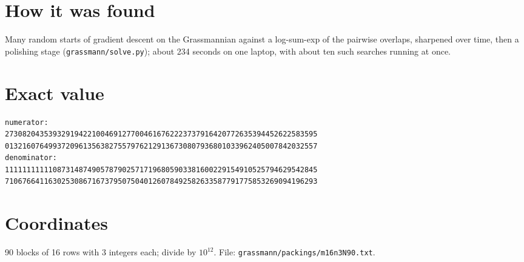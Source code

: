 \documentclass[11pt,a4paper]{article}
\begin{document}
\section{How it was found}
Many random starts of gradient descent on the Grassmannian against a log-sum-exp of the pairwise overlaps, sharpened over time, then a polishing stage (\texttt{grassmann/solve.py}); about 234 seconds on one laptop, with about ten such searches running at once.


\appendix
\section{Exact value}
{\small
\begin{verbatim}
numerator:
273082043539329194221004691277004616762223737916420772635394452622583595
013216076499372096135638275579762129136730807936801033962405007842032557
denominator:
111111111110873148749057879025717196805903381600229154910525794629542845
710676641163025308671673795075040126078492582633587791775853269094196293
\end{verbatim}}

\section{Coordinates}
90 blocks of 16 rows with 3 integers each; divide by $10^{12}$. File: \texttt{grassmann/packings/m16n3N90.txt}.
{\tiny
\begin{multicols}{3}
\end{multicols}}
\end{document}
